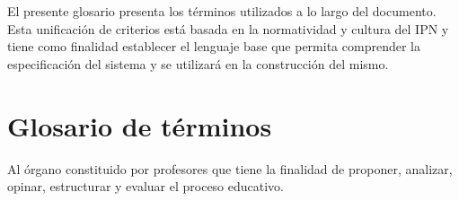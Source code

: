 El presente glosario presenta los términos utilizados a lo largo del documento. Esta unificación de criterios está basada en la normatividad y cultura del IPN y tiene como finalidad establecer el lenguaje base que permita comprender la especificación del sistema y se utilizará en la construcción del mismo.

\section{Glosario de términos}
\begin{bGlosario}
	 Al órgano constituido por profesores que tiene la finalidad de proponer, analizar, opinar, estructurar y evaluar el proceso educativo.

\end{bGlosario}

